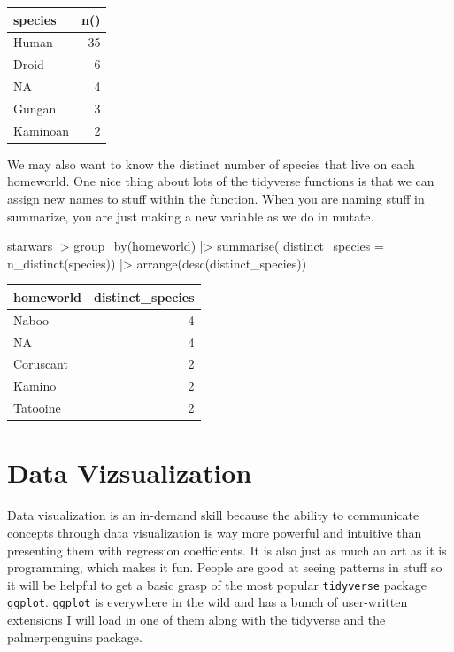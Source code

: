 \documentclass[
  letterpaper,
  DIV=11,
  numbers=noendperiod,
  oneside]{scrreprt}
\newenvironment{Shaded}{\begin{snugshade}}{\end{snugshade}}
\newcommand{\AttributeTok}[1]{\textcolor[rgb]{0.40,0.45,0.13}{#1}}
\newcommand{\FunctionTok}[1]{\textcolor[rgb]{0.28,0.35,0.67}{#1}}
\newcommand{\NormalTok}[1]{\textcolor[rgb]{0.00,0.23,0.31}{#1}}
\newcommand{\SpecialCharTok}[1]{\textcolor[rgb]{0.37,0.37,0.37}{#1}}
\begin{document}
\begin{tabular}{l|r}
\hline
species & n()\\
\hline
Human & 35\\
\hline
Droid & 6\\
\hline
NA & 4\\
\hline
Gungan & 3\\
\hline
Kaminoan & 2\\
\hline
\end{tabular}

We may also want to know the distinct number of species that live on
each homeworld. One nice thing about lots of the tidyverse functions is
that we can assign new names to stuff within the function. When you are
naming stuff in summarize, you are just making a new variable as we do
in mutate.

\begin{Shaded}
\begin{Highlighting}[]
\NormalTok{starwars }\SpecialCharTok{|\textgreater{}}
\FunctionTok{group\_by}\NormalTok{(homeworld) }\SpecialCharTok{|\textgreater{}}
\FunctionTok{summarise}\NormalTok{( }\AttributeTok{distinct\_species =} \FunctionTok{n\_distinct}\NormalTok{(species)) }\SpecialCharTok{|\textgreater{}}
\FunctionTok{arrange}\NormalTok{(}\FunctionTok{desc}\NormalTok{(distinct\_species))}
\end{Highlighting}
\end{Shaded}

\begin{tabular}{l|r}
\hline
homeworld & distinct\_species\\
\hline
Naboo & 4\\
\hline
NA & 4\\
\hline
Coruscant & 2\\
\hline
Kamino & 2\\
\hline
Tatooine & 2\\
\hline
\end{tabular}


\hypertarget{data-vizsualization}{%
\chapter{Data Vizsualization}\label{data-vizsualization}}

Data visualization is an in-demand skill because the ability to
communicate concepts through data visualization is way more powerful and
intuitive than presenting them with regression coefficients. It is also
just as much an art as it is programming, which makes it fun. People are
good at seeing patterns in stuff so it will be helpful to get a basic
grasp of the most popular \texttt{tidyverse} package \texttt{ggplot}.
\texttt{ggplot} is everywhere in the wild and has a bunch of
user-written extensions I will load in one of them along with the
tidyverse and the palmerpenguins package.
\end{document}
